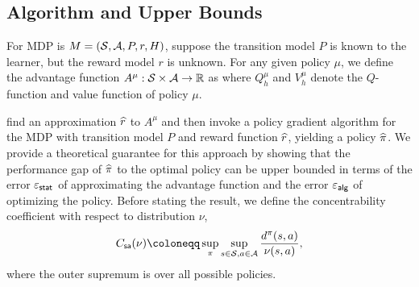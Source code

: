 \documentclass{article}
\newcommand{\arxiv}[1]{\iftoggle{icml}{}{#1}}
\newcommand{\icml}[1]{\iftoggle{icml}{#1}{}}
\begin{document}
\subsection{Algorithm and Upper Bounds}

For MDP is $M = (\calS, \calA, P, r, H)$, suppose the transition model $P$ is known to the learner, but the reward model $r$ is unknown. For any given policy $\mu$, we define the advantage function $A^\mu: \calS\times\calA\to \RR$ as 
\icml{\begin{small}
\begin{equation}\label{eq: def-advantage-function}
    A^\mu(s, a) = Q_h^\mu(s, a) - V_h^\mu(s),\arxiv{\qquad}\icml{~} \forall h\in [H], s\in \calS_h, a\in \calA,
\end{equation}
\end{small}}
\arxiv{\begin{equation}\label{eq: def-advantage-function}
    A^\mu(s, a) = Q_h^\mu(s, a) - V_h^\mu(s),\arxiv{\qquad}\icml{~} \forall h\in [H], s\in \calS_h, a\in \calA,
\end{equation}}
where $Q_h^\mu$ and $V_h^\mu$ denote the $Q$-function and value function of policy $\mu$.

\citet{setlur2024rewarding} find an approximation $\hr$ to $A^\mu$ and then invoke a policy gradient algorithm for the MDP with transition model $P$ and reward function $\hr$, yielding a policy $\hpi$. We provide a theoretical guarantee for this approach by showing that the performance gap of $\hpi$ to the optimal policy can be upper bounded in terms of the error $\epsilon_{\sf stat}$ of approximating the advantage function and the error $\epsilon_{\sf alg}$ of optimizing the policy. Before stating the result, we define the concentrability coefficient with respect to distribution $\nu$,
    \begin{equation}\label{eq: def-C-nu}
        \Cs(\nu)\coloneqq \sup_{\pi} \sup_{s\in \calS, a\in \calA}\frac{d^\pi(s, a)}{\nu(s, a)},
    \end{equation}
    where the outer supremum is over all possible policies.
\end{document}
